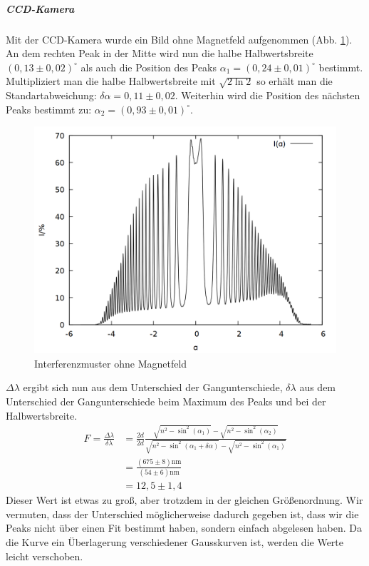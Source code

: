 \subparagraph{CCD-Kamera}
Mit der CCD-Kamera wurde ein Bild ohne Magnetfeld aufgenommen (Abb. \ref{fig:ohneb}).\\
An dem rechten Peak in der Mitte wird nun die halbe Halbwertsbreite $(0,13 \pm 0,02)^\circ$  als auch die Position des Peaks $\alpha_{1} = (0,24\pm 0,01)^\circ$ bestimmt. Multipliziert man die halbe Halbwertsbreite mit $\sqrt{2\ln 2}$ so erhält man die Standartabweichung: $\delta \alpha = 0,11 \pm 0,02$. Weiterhin wird die Position des nächsten Peaks bestimmt zu: $\alpha_2 = (0,93\pm 0,01)^\circ$.\\
\begin{figure}[h]
\centering
\includegraphics[scale=0.25]{data/zeeman/out_0_0_raw.png}
\caption{Interferenzmuster ohne Magnetfeld}
\label{fig:ohneb}
\end{figure}

$\Delta \lambda$ ergibt sich nun aus dem Unterschied der Gangunterschiede, $\delta \lambda$ aus dem Unterschied der Gangunterschiede beim Maximum des Peaks und bei der Halbwertsbreite.
\begin{align*}
F = \frac{\Delta \lambda}{\delta \lambda} &= \frac{2d}{2d}\frac{\sqrt{n^2-\sin^2(\alpha_1)}-\sqrt{n^2-\sin^2(\alpha_2)}}{\sqrt{n^2-\sin^2(\alpha_1+\delta \alpha)}-\sqrt{n^2-\sin^2(\alpha_1)}}\\
	&= \frac{(675 \pm 8) \si{\nano\meter}}{(54 \pm 6) \si{\nano\meter}}\\
	&=12,5 \pm 1,4
\end{align*}
Dieser Wert ist etwas zu groß, aber trotzdem in der gleichen Größenordnung. Wir vermuten, dass der Unterschied möglicherweise dadurch gegeben ist, dass wir die Peaks nicht über einen Fit bestimmt haben, sondern einfach abgelesen haben. Da die Kurve ein Überlagerung verschiedener Gausskurven ist, werden die Werte leicht verschoben.

